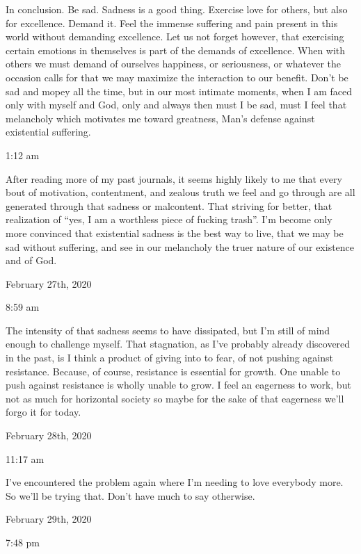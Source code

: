 \qquad In conclusion. Be sad. Sadness is a good thing. Exercise love for
others, but also for excellence. Demand it. Feel the immense suffering
and pain present in this world without demanding excellence. Let us not
forget however, that exercising certain emotions in themselves is part
of the demands of excellence. When with others we must demand of
ourselves happiness, or seriousness, or whatever the occasion calls for
that we may maximize the interaction to our benefit. Don't be sad and
mopey all the time, but in our most intimate moments, when I am faced
only with myself and God, only and always then must I be sad, must I
feel that melancholy which motivates me toward greatness, Man's defense
against existential suffering.

1:12 am

After reading more of my past journals, it seems highly likely to me
that every bout of motivation, contentment, and zealous truth we feel
and go through are all generated through that sadness or malcontent.
That striving for better, that realization of ``yes, I am a worthless
piece of fucking trash''. I'm become only more convinced that
existential sadness is the best way to live, that we may be sad without
suffering, and see in our melancholy the truer nature of our existence
and of God.

\bigskip
\bigskip
February 27th, 2020

8:59 am

The intensity of that sadness seems to have dissipated, but I'm still of
mind enough to challenge myself. That stagnation, as I've probably
already discovered in the past, is I think a product of giving into to
fear, of not pushing against resistance. Because, of course, resistance
is essential for growth. One unable to push against resistance is wholly
unable to grow. I feel an eagerness to work, but not as much for
horizontal society so maybe for the sake of that eagerness we'll forgo
it for today.

\bigskip
\bigskip
February 28th, 2020

11:17 am

I've encountered the problem again where I'm needing to love everybody
more. So we'll be trying that. Don't have much to say otherwise.

\bigskip
\bigskip
February 29th, 2020

7:48 pm

